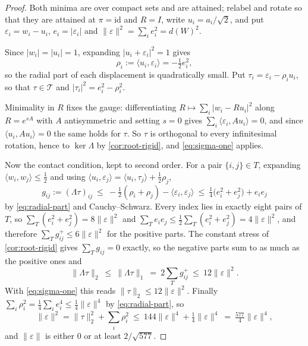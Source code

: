\documentclass[11pt,reqno]{amsart}
\renewcommand{\_}{\origunderscore\allowbreak}
\numberwithin{equation}{section}
\theoremstyle{plain}
\theoremstyle{definition}
\theoremstyle{remark}
\begin{document}
\begin{proof}
Both minima are over compact sets and are attained; relabel and rotate
so that they are attained at $\pi=\mathrm{id}$ and $R=I$, write
$u_i=a_i/\sqrt2$, and put $\varepsilon_i=w_i-u_i$, $e_i=|\varepsilon_i|$
and $\|\varepsilon\|^2=\sum_ie_i^2=d(W)^2$.

Since $|w_i|=|u_i|=1$, expanding $|u_i+\varepsilon_i|^2=1$ gives
\begin{equation}\label{eq:radial-part}
  \rho_i:=\langle u_i,\varepsilon_i\rangle=-\tfrac12e_i^2 ,
\end{equation}
so the radial part of each displacement is quadratically small. Put
$\tau_i=\varepsilon_i-\rho_iu_i$, so that $\tau\in\mathcal{T}$ and
$|\tau_i|^2=e_i^2-\rho_i^2$.

Minimality in $R$ fixes the gauge: differentiating
$R\mapsto\sum_i|w_i-Ru_i|^2$ along $R=e^{sA}$ with $A$ antisymmetric and
setting $s=0$ gives $\sum_i\langle\varepsilon_i,Au_i\rangle=0$, and since
$\langle u_i,Au_i\rangle=0$ the same holds for $\tau$. So $\tau$ is
orthogonal to every infinitesimal rotation, hence to $\ker\Lambda$ by
\cref{cor:root-rigid}, and \eqref{eq:sigma-one} applies.

Now the contact condition, kept to second order. For a pair
$\{i,j\}\in T$, expanding $\langle w_i,w_j\rangle\le\tfrac12$ and
using $\langle u_i,\varepsilon_j\rangle=\langle u_i,\tau_j\rangle+\tfrac12\rho_j$,
\[
  g_{ij}:=(\Lambda\tau)_{ij}
  \ \le\ -\tfrac12(\rho_i+\rho_j)-\langle\varepsilon_i,\varepsilon_j\rangle
  \ \le\ \tfrac14\bigl(e_i^2+e_j^2\bigr)+e_ie_j
\]
by \eqref{eq:radial-part} and Cauchy--Schwarz. Every index lies in exactly
eight pairs of $T$, so
$\sum_{T}(e_i^2+e_j^2)=8\|\varepsilon\|^2$ and
$\sum_{T}e_ie_j\le\tfrac12\sum_{T}(e_i^2+e_j^2)=4\|\varepsilon\|^2$,
and therefore $\sum_{T}g_{ij}^{+}\le6\|\varepsilon\|^2$ for the
positive parts. The constant stress of \cref{cor:root-rigid} gives
$\sum_{T}g_{ij}=0$ exactly, so the negative parts sum to as much
as the positive ones and
\[
  \|\Lambda\tau\|_2\ \le\ \|\Lambda\tau\|_1
  \ =\ 2\sum_{T}g_{ij}^{+}\ \le\ 12\|\varepsilon\|^2 .
\]
With \eqref{eq:sigma-one} this reads $\|\tau\|_2\le12\|\varepsilon\|^2$.
Finally $\sum_i\rho_i^2=\tfrac14\sum_ie_i^4\le\tfrac14\|\varepsilon\|^4$
by \eqref{eq:radial-part}, so
\[
  \|\varepsilon\|^2=\|\tau\|_2^2+\sum_i\rho_i^2
  \ \le\ 144\|\varepsilon\|^4+\tfrac14\|\varepsilon\|^4
  \ =\ \tfrac{577}4\|\varepsilon\|^4 ,
\]
and $\|\varepsilon\|$ is either $0$ or at least $2/\sqrt{577}$.
\end{proof}
\end{document}
